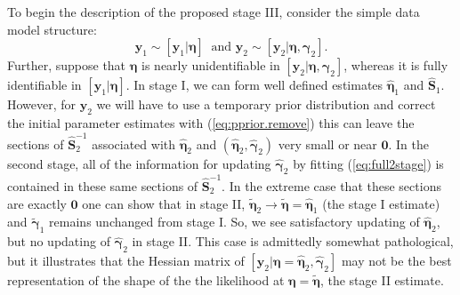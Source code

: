 \documentclass[12pt]{article}
\newcommand{\by}{\mathbf{y}}
\newcommand{\bn}{\boldsymbol{\eta}}
\newcommand{\bg}{\boldsymbol{\gamma}}
\newcommand{\bS}{\mathbf{S}}
\begin{document}
To begin the description of the proposed stage III, consider the simple data model structure:
\begin{equation}
\by_1 \sim [\by_1|\bn]\ \text{ and } \by_2 \sim [\by_2|\bn,\bg_2].
\end{equation} 
Further, suppose that $\bn$ is nearly unidentifiable in $[\by_2|\bn,\bg_2]$, whereas it is fully identifiable in $[\by_1|\bn]$. In stage I, we can form well defined estimates $\hat{\bn}_1$ and $\hat{\bS}_1$. However, for $\by_2$ we will have to use a temporary prior distribution and correct the initial parameter estimates with (\ref{eq:pprior.remove}) this can leave the sections of $\hat{\bS}_2^{-1}$ associated with $\hat{\bn}_2$ and $(\hat{\bn}_2, \hat{\bg}_2)$ very small or near $\mathbf{0}$. In the second stage, all of the information for updating $\hat{\bg}_2$ by fitting (\ref{eq:full2stage}) is contained in these same sections of $\hat{\bS}_2^{-1}$. In the extreme case that these sections are exactly $\mathbf{0}$ one can show that in stage II, $\tilde{\bn}_2 \to \tilde{\bn} = \hat{\bn}_1$ (the stage I estimate) and $\tilde{\bg}_1$ remains unchanged from stage I. So, we see satisfactory updating of $\hat{\bn}_2$, but no updating of $\hat{\bg}_2$ in stage II. This case is admittedly somewhat pathological, but it illustrates that the Hessian matrix of $[\by_2|\bn=\hat{\bn}_2, \hat{\bg}_2]$ may not be the best representation of the shape of the the likelihood at $\bn = \tilde{\bn}$, the stage II estimate. 
\end{document}
